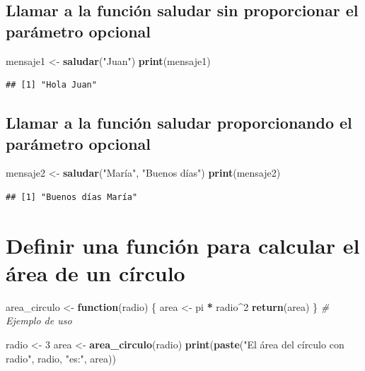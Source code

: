 \documentclass[
]{book}
\newenvironment{Shaded}{\begin{snugshade}}{\end{snugshade}}
\newcommand{\CommentTok}[1]{\textcolor[rgb]{0.56,0.35,0.01}{\textit{#1}}}
\newcommand{\ControlFlowTok}[1]{\textcolor[rgb]{0.13,0.29,0.53}{\textbf{#1}}}
\newcommand{\DecValTok}[1]{\textcolor[rgb]{0.00,0.00,0.81}{#1}}
\newcommand{\FunctionTok}[1]{\textcolor[rgb]{0.13,0.29,0.53}{\textbf{#1}}}
\newcommand{\NormalTok}[1]{#1}
\newcommand{\OtherTok}[1]{\textcolor[rgb]{0.56,0.35,0.01}{#1}}
\newcommand{\SpecialCharTok}[1]{\textcolor[rgb]{0.81,0.36,0.00}{\textbf{#1}}}
\newcommand{\StringTok}[1]{\textcolor[rgb]{0.31,0.60,0.02}{#1}}
\begin{document}
\subsection{Llamar a la función saludar sin proporcionar el parámetro opcional}\label{llamar-a-la-funciuxf3n-saludar-sin-proporcionar-el-paruxe1metro-opcional}

\begin{Shaded}
\begin{Highlighting}[]
\NormalTok{mensaje1 }\OtherTok{\textless{}{-}} \FunctionTok{saludar}\NormalTok{(}\StringTok{"Juan"}\NormalTok{)}
\FunctionTok{print}\NormalTok{(mensaje1)}
\end{Highlighting}
\end{Shaded}

\begin{verbatim}
## [1] "Hola Juan"
\end{verbatim}

\subsection{Llamar a la función saludar proporcionando el parámetro opcional}\label{llamar-a-la-funciuxf3n-saludar-proporcionando-el-paruxe1metro-opcional}

\begin{Shaded}
\begin{Highlighting}[]
\NormalTok{mensaje2 }\OtherTok{\textless{}{-}} \FunctionTok{saludar}\NormalTok{(}\StringTok{"María"}\NormalTok{, }\StringTok{"Buenos días"}\NormalTok{)}
\FunctionTok{print}\NormalTok{(mensaje2)}
\end{Highlighting}
\end{Shaded}

\begin{verbatim}
## [1] "Buenos días María"
\end{verbatim}

\section{Definir una función para calcular el área de un círculo}\label{definir-una-funciuxf3n-para-calcular-el-uxe1rea-de-un-cuxedrculo}

\begin{Shaded}
\begin{Highlighting}[]
\NormalTok{area\_circulo }\OtherTok{\textless{}{-}} \ControlFlowTok{function}\NormalTok{(radio) \{}
\NormalTok{  area }\OtherTok{\textless{}{-}}\NormalTok{ pi }\SpecialCharTok{*}\NormalTok{ radio}\SpecialCharTok{\^{}}\DecValTok{2}
  \FunctionTok{return}\NormalTok{(area)}
\NormalTok{\}}
\CommentTok{\# Ejemplo de uso}

\NormalTok{radio }\OtherTok{\textless{}{-}} \DecValTok{3}
\NormalTok{area }\OtherTok{\textless{}{-}} \FunctionTok{area\_circulo}\NormalTok{(radio)}
\FunctionTok{print}\NormalTok{(}\FunctionTok{paste}\NormalTok{(}\StringTok{"El área del círculo con radio"}\NormalTok{, radio, }\StringTok{"es:"}\NormalTok{, area))}
\end{Highlighting}
\end{Shaded}
\end{document}
